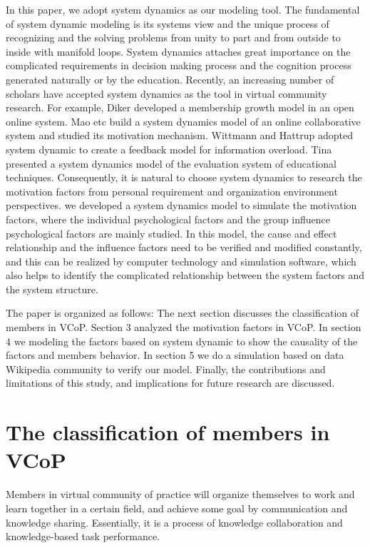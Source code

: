 \documentclass{elsarticle}
\begin{document}
In this paper, we adopt system dynamics as our modeling
tool. The fundamental of system dynamic modeling is its systems view
and the unique process of recognizing and the solving problems from
unity to part and from outside to inside with manifold
loops. System dynamics attaches great importance on the complicated
requirements in decision making process and the cognition process
generated naturally or by the education. Recently, an increasing
number of scholars have accepted system dynamics as the tool in
virtual community research. For example, Diker  developed a
membership growth model in an open online system\cite{diker2004dynamic}. Mao etc build a system dynamics model of an online collaborative system and studied
its motivation mechanism\cite{4076734}. Wittmann and  Hattrup
adopted system dynamic to create a feedback model for information
overload\cite{wittmann_relationship_2004}. Tina presented a system dynamics model of
the evaluation system of educational techniques\cite{stavredes2001system}. Consequently, it is natural to choose system dynamics to
research the motivation factors from personal requirement and
organization environment perspectives. we developed a system dynamics model to simulate the motivation factors, where the individual psychological factors and the group influence psychological factors are mainly studied. In this model, the cause and effect relationship and the influence factors need to be verified and modified constantly, and this can be realized by computer technology and simulation software, which also helps to identify the complicated relationship between the system factors and the system structure. 
 
The paper is organized as follows: The next section discusses the
classification of members in VCoP. Section 3 analyzed the motivation factors
in VCoP. In section 4 we modeling the factors based on system dynamic
to show the causality of the factors and members behavior. In section
5 we do a simulation based on data Wikipedia community to verify our model.  Finally, the contributions and limitations of this study, and implications for future research are discussed.






\section{The classification of members in VCoP}
\label{sec:classification-uses}

Members in virtual community of practice will organize themselves to work and learn together in a certain field, and achieve some goal by communication and knowledge sharing. Essentially, it is a process of knowledge collaboration and knowledge-based task performance. 
\end{document}
